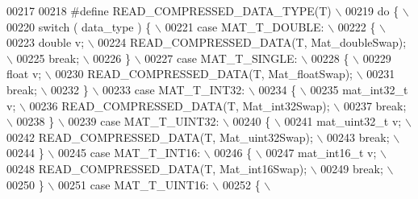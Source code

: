 \begin{DoxyCode}
00217 
00218 \textcolor{preprocessor}{#define READ\_COMPRESSED\_DATA\_TYPE(T) \(\backslash\)}
00219 \textcolor{preprocessor}{    do \{ \(\backslash\)}
00220 \textcolor{preprocessor}{        switch ( data\_type ) \{ \(\backslash\)}
00221 \textcolor{preprocessor}{            case MAT\_T\_DOUBLE: \(\backslash\)}
00222 \textcolor{preprocessor}{            \{ \(\backslash\)}
00223 \textcolor{preprocessor}{                double v; \(\backslash\)}
00224 \textcolor{preprocessor}{                READ\_COMPRESSED\_DATA(T, Mat\_doubleSwap); \(\backslash\)}
00225 \textcolor{preprocessor}{                break; \(\backslash\)}
00226 \textcolor{preprocessor}{            \} \(\backslash\)}
00227 \textcolor{preprocessor}{            case MAT\_T\_SINGLE: \(\backslash\)}
00228 \textcolor{preprocessor}{            \{ \(\backslash\)}
00229 \textcolor{preprocessor}{                float v; \(\backslash\)}
00230 \textcolor{preprocessor}{                READ\_COMPRESSED\_DATA(T, Mat\_floatSwap); \(\backslash\)}
00231 \textcolor{preprocessor}{                break; \(\backslash\)}
00232 \textcolor{preprocessor}{            \} \(\backslash\)}
00233 \textcolor{preprocessor}{            case MAT\_T\_INT32: \(\backslash\)}
00234 \textcolor{preprocessor}{            \{ \(\backslash\)}
00235 \textcolor{preprocessor}{                mat\_int32\_t v; \(\backslash\)}
00236 \textcolor{preprocessor}{                READ\_COMPRESSED\_DATA(T, Mat\_int32Swap); \(\backslash\)}
00237 \textcolor{preprocessor}{                break; \(\backslash\)}
00238 \textcolor{preprocessor}{            \} \(\backslash\)}
00239 \textcolor{preprocessor}{            case MAT\_T\_UINT32: \(\backslash\)}
00240 \textcolor{preprocessor}{            \{ \(\backslash\)}
00241 \textcolor{preprocessor}{                mat\_uint32\_t v; \(\backslash\)}
00242 \textcolor{preprocessor}{                READ\_COMPRESSED\_DATA(T, Mat\_uint32Swap); \(\backslash\)}
00243 \textcolor{preprocessor}{                break; \(\backslash\)}
00244 \textcolor{preprocessor}{            \} \(\backslash\)}
00245 \textcolor{preprocessor}{            case MAT\_T\_INT16: \(\backslash\)}
00246 \textcolor{preprocessor}{            \{ \(\backslash\)}
00247 \textcolor{preprocessor}{                mat\_int16\_t v; \(\backslash\)}
00248 \textcolor{preprocessor}{                READ\_COMPRESSED\_DATA(T, Mat\_int16Swap); \(\backslash\)}
00249 \textcolor{preprocessor}{                break; \(\backslash\)}
00250 \textcolor{preprocessor}{            \} \(\backslash\)}
00251 \textcolor{preprocessor}{            case MAT\_T\_UINT16: \(\backslash\)}
00252 \textcolor{preprocessor}{            \{ \(\backslash\)}

\end{DoxyCode}
